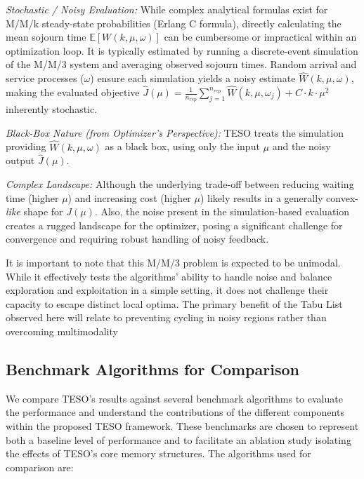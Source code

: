 \documentclass{article}
\begin{document}
    \noindent \textit{Stochastic / Noisy Evaluation:} While complex analytical formulas exist for M/M/k steady-state probabilities (Erlang C formula), directly calculating the mean sojourn time $\mathbb{E}[W(k, \mu, \omega)]$ can be cumbersome or impractical within an optimization loop. It is typically estimated by running a discrete-event simulation of the M/M/3 system and averaging observed sojourn times. Random arrival and service processes ($\omega$) ensure each simulation yields a noisy estimate $\hat{W}(k, \mu, \omega)$, making the evaluated objective $\hat{J}(\mu) = \frac{1}{n_{rep}}\sum_{j=1}^{n_{rep}} \hat{W}(k, \mu, \omega_j) + C \cdot k \cdot \mu^2$ inherently stochastic.
    
    \noindent \textit{Black-Box Nature (from Optimizer's Perspective):} TESO treats the simulation providing $\hat{W}(k, \mu, \omega)$ as a black box, using only the input $\mu$ and the noisy output $\hat{J}(\mu)$.
    
    \noindent \textit{Complex Landscape:} Although the underlying trade-off between reducing waiting time (higher $\mu$) and increasing cost (higher $\mu$) likely results in a generally convex-\textit{like} shape for $J(\mu)$. Also, the noise present in the simulation-based evaluation creates a rugged landscape for the optimizer, posing a significant challenge for convergence and requiring robust handling of noisy feedback.

It is important to note that this M/M/3 problem is expected to be unimodal. While it effectively tests the algorithms' ability to handle noise and balance exploration and exploitation in a simple setting, it does not challenge their capacity to escape distinct local optima. The primary benefit of the Tabu List observed here will relate to preventing cycling in noisy regions rather than overcoming multimodality

\subsection{Benchmark Algorithms for Comparison}
\label{subsec:benchmarks}

We compare TESO's results against several benchmark algorithms to evaluate the performance and understand the contributions of the different components within the proposed TESO framework. These benchmarks are chosen to represent both a baseline level of performance and to facilitate an ablation study isolating the effects of TESO's core memory structures. The algorithms used for comparison are:
\end{document}
